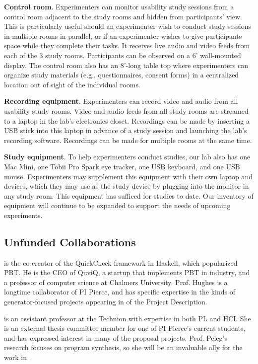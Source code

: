 \textbf{Control room}. Experimenters can monitor usability study sessions from a control room adjacent to the study rooms and hidden from participants' view. This is particularly useful should an experimenter wish to conduct study sessions in multiple rooms in parallel, or if an experimenter wishes to give participants space while they complete their tasks. It receives live audio and video feeds from each of the 3 study rooms. Participants can be observed on a 6' wall-mounted display. The control room also has an 8'-long table top where experimenters can organize study materials (e.g., questionnaires, consent forms) in a centralized location out of sight of the individual rooms.

\textbf{Recording equipment}. Experimenters can record video and audio from all usability study rooms. Video and audio feeds from all study rooms are streamed to a laptop in the lab's electronics closet. Recordings can be made by inserting a USB stick into this laptop in advance of a study session and launching the lab's recording software. Recordings can be made for multiple rooms at the same time.

\textbf{Study equipment}. To help experimenters conduct studies, our lab also has one Mac Mini, one Tobii Pro Spark eye tracker, one USB keyboard, and one USB mouse. Experimenters may supplement this equipment with their own laptop and devices, which they may use as the study device by plugging into the monitor in any study room. This equipment has sufficed for studies to date. Our inventory of equipment will continue to be expanded to support the needs of upcoming experiments.

\subsection*{Unfunded Collaborations}


 is the co-creator of the QuickCheck framework in
Haskell, which popularized PBT. He is the CEO of QuviQ, a startup that
implements PBT in industry, and a professor of computer science at Chalmers
University.  Prof. Hughes is a longtime collaborator of PI
Pierce, and has specific expertise in the kinds of generator-focused projects
appearing in  of the Project Description.

\smallskip{} is an assistant professor at the Technion with expertise in both
PL and HCI. She is an external thesis committee member for one of PI Pierce's current
students, and has expressed interest in many of the proposal
projects. Prof. Peleg's research
focuses on program synthesis, so she will be an invaluable ally for the work in
.

